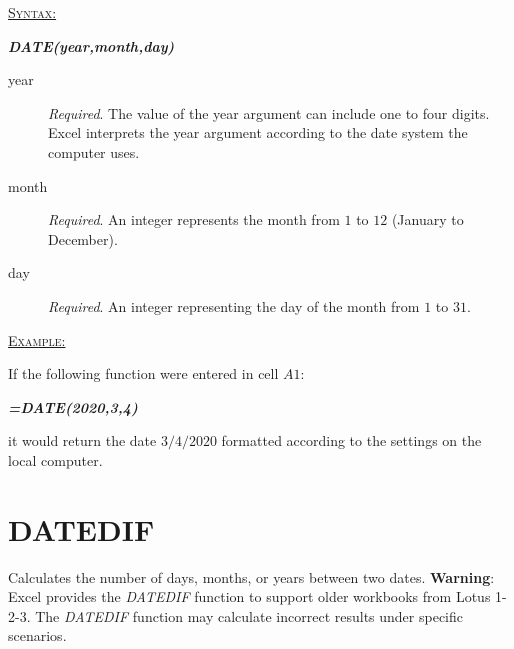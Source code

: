 \begin{addmargin}[1cm]{0cm}

	\medskip
	\underline{\textsc{Syntax:}}
	\medskip

	{\color{Syntax}
		\noindent\textbf{\textit{DATE(year,month,day)}}
	}
	
	\begin{description}
		\item[year] \textit{Required}. The value of the year argument can include one to four digits. Excel interprets the year argument according to the date system the computer uses.
		\item[month] \textit{Required}. An integer represents the month from $ 1 $ to $ 12 $ (January to December).
		\item[day] \textit{Required}. An integer representing the day of the month from $ 1 $ to $ 31 $.
	\end{description}

	\medskip
	\noindent\underline{\textsc{Example:}}
	\medskip
		
	\noindent If the following function were entered in cell $ A1 $:
	
	{\color{Syntax}
		\textit{\textbf{=DATE(2020,3,4)}}
	}

	\noindent it would return the date $ 3/4/2020 $ formatted according to the settings on the local computer.
	
\end{addmargin}

\section{DATEDIF}

Calculates the number of days, months, or years between two dates. \textbf{Warning}: Excel provides the \textit{DATEDIF} function to support older workbooks from Lotus 1-2-3. The \textit{DATEDIF} function may calculate incorrect results under specific scenarios.

